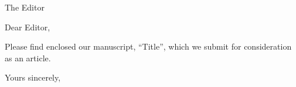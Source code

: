 \documentclass[12pt]{letter}
\begin{document}
\begin{letter}{The Editor}
\opening{Dear Editor,}

Please find enclosed our manuscript, ``Title'', which we submit for consideration as an article.

\closing{Yours sincerely,}
\end{letter}
\end{document}
